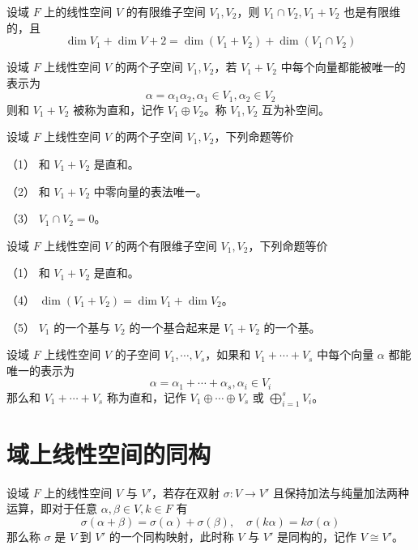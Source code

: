 \begin{theorem}
    设域 $F$ 上的线性空间 $V$ 的有限维子空间 $V_1,V_2$，则 $V_1 \cap V_2, V_1+V_2$ 也是有限维的，且
    \[ \dim V_1 + \dim V+2 = \dim(V_1+V_2) + \dim(V_1 \cap V_2) \]
\end{theorem}

\begin{definition}[直和]
    设域 $F$ 上线性空间 $V$ 的两个子空间 $V_1,V_2$，若 $V_1+V_2$ 中每个向量都能被唯一的表示为
    \[ \alpha = \alpha_1 \alpha_2, \alpha_1 \in V_1, \alpha_2 \in V_2 \]
    则和 $V_1+V_2$ 被称为直和，记作 $V_1 \oplus V_2$。称 $V_1,V_2$ 互为补空间。 
\end{definition}

\begin{theorem}
    设域 $F$ 上线性空间 $V$ 的两个子空间 $V_1,V_2$，下列命题等价

    （1） 和 $V_1+V_2$ 是直和。

    （2） 和 $V_1+V_2$ 中零向量的表法唯一。

    （3） $V_1 \cap V_2 = 0$。
\end{theorem}

\begin{theorem}
    设域 $F$ 上线性空间 $V$ 的两个有限维子空间 $V_1,V_2$，下列命题等价

    （1） 和 $V_1+V_2$ 是直和。

    （4） $\dim(V_1+V_2) = \dim V_1 + \dim V_2$。

    （5） $V_1$ 的一个基与 $V_2$ 的一个基合起来是 $V_1+V_2$ 的一个基。
\end{theorem}

\begin{definition}
    设域 $F$ 上线性空间 $V$ 的子空间 $V_1,\cdots,V_s$，如果和 $V_1+\cdots+V_s$ 中每个向量 $\alpha$ 都能唯一的表示为
    \[ \alpha = \alpha_1 + \cdots + \alpha_s, \alpha_i \in V_i \]
    那么和 $V_1 + \cdots + V_s$ 称为直和，记作 $V_1 \oplus \cdots \oplus V_s$ 或 $\displaystyle\bigoplus_{i=1}^s V_i$。
\end{definition}

\section{域上线性空间的同构}

\begin{definition}[同构]
    设域 $F$ 上的线性空间 $V$ 与 $V'$，若存在双射 $\sigma : V \to V'$ 且保持加法与纯量加法两种运算，即对于任意 $\alpha,\beta \in V,k\in F$ 有
    \[ \sigma(\alpha+\beta) = \sigma(\alpha) + \sigma(\beta), \quad \sigma(k\alpha) = k\sigma(\alpha) \]
    那么称 $\sigma$ 是 $V$ 到 $V'$ 的一个同构映射，此时称 $V$ 与 $V'$ 是同构的，记作 $V \cong V'$。
\end{definition}

